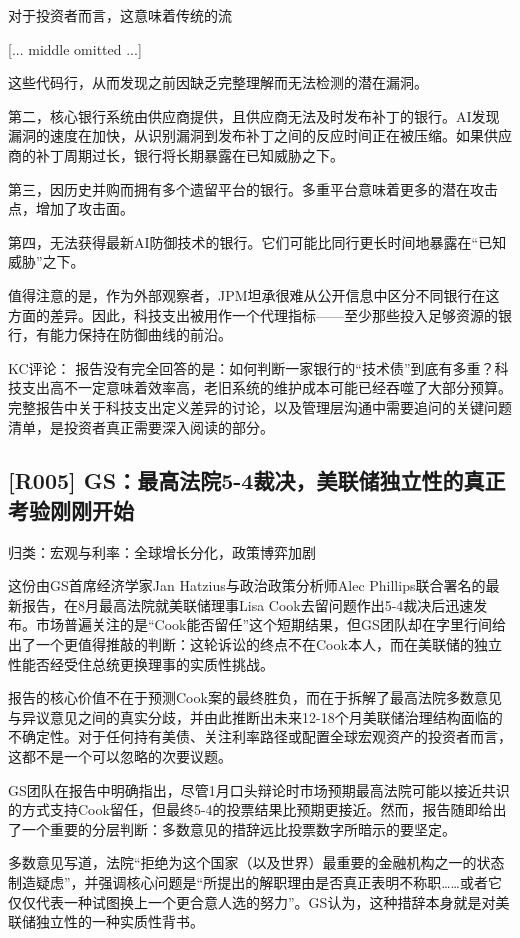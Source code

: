 \documentclass[11pt]{ctexart}
\begin{document}
对于投资者而言，这意味着传统的流

[... middle omitted ...]

这些代码行，从而发现之前因缺乏完整理解而无法检测的潜在漏洞。

第二，核心银行系统由供应商提供，且供应商无法及时发布补丁的银行。AI发现漏洞的速度在加快，从识别漏洞到发布补丁之间的反应时间正在被压缩。如果供应商的补丁周期过长，银行将长期暴露在已知威胁之下。

第三，因历史并购而拥有多个遗留平台的银行。多重平台意味着更多的潜在攻击点，增加了攻击面。

第四，无法获得最新AI防御技术的银行。它们可能比同行更长时间地暴露在“已知威胁”之下。

值得注意的是，作为外部观察者，JPM坦承很难从公开信息中区分不同银行在这方面的差异。因此，科技支出被用作一个代理指标——至少那些投入足够资源的银行，有能力保持在防御曲线的前沿。

KC评论： 报告没有完全回答的是：如何判断一家银行的“技术债”到底有多重？科技支出高不一定意味着效率高，老旧系统的维护成本可能已经吞噬了大部分预算。完整报告中关于科技支出定义差异的讨论，以及管理层沟通中需要追问的关键问题清单，是投资者真正需要深入阅读的部分。

\subsection{[R005] GS：最高法院5-4裁决，美联储独立性的真正考验刚刚开始}
{\small\color{refgray}归类：宏观与利率：全球增长分化，政策博弈加剧}

这份由GS首席经济学家Jan Hatzius与政治政策分析师Alec Phillips联合署名的最新报告，在8月最高法院就美联储理事Lisa Cook去留问题作出5-4裁决后迅速发布。市场普遍关注的是“Cook能否留任”这个短期结果，但GS团队却在字里行间给出了一个更值得推敲的判断：这轮诉讼的终点不在Cook本人，而在美联储的独立性能否经受住总统更换理事的实质性挑战。

报告的核心价值不在于预测Cook案的最终胜负，而在于拆解了最高法院多数意见与异议意见之间的真实分歧，并由此推断出未来12-18个月美联储治理结构面临的不确定性。对于任何持有美债、关注利率路径或配置全球宏观资产的投资者而言，这都不是一个可以忽略的次要议题。

GS团队在报告中明确指出，尽管1月口头辩论时市场预期最高法院可能以接近共识的方式支持Cook留任，但最终5-4的投票结果比预期更接近。然而，报告随即给出了一个重要的分层判断：多数意见的措辞远比投票数字所暗示的要坚定。

多数意见写道，法院“拒绝为这个国家（以及世界）最重要的金融机构之一的状态制造疑虑”，并强调核心问题是“所提出的解职理由是否真正表明不称职……或者它仅仅代表一种试图换上一个更合意人选的努力”。GS认为，这种措辞本身就是对美联储独立性的一种实质性背书。
\end{document}
